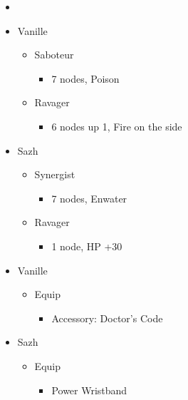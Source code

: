 \documentclass{report}
\begin{document}
\begin{menu}
\begin{itemize}
    \paradigm
    \begin{itemize}
        \item {}%
{\paradigmline{\rav}{\com}{}}%
{\paradigmline{(\sab)}{\com}{}}%
{\paradigmline{\textit{\sab}}{\textit{\syn}}{}}%
{\paradigmline{\rav}{\rav}{}}%
{\paradigmline{[\sab]}{(\rav)}{}}%
{\paradigmline{[\sab]}{\com}{}}
    \end{itemize}
    \crystarium
    \begin{itemize}
        \item Vanille
        \begin{itemize}
            \item Saboteur
            \begin{itemize}
                \item 7 nodes, Poison
            \end{itemize}
            \item Ravager
            \begin{itemize}
                \item 6 nodes up 1, Fire on the side
            \end{itemize}
        \end{itemize}
        \item Sazh
        \begin{itemize}
            \item Synergist
            \begin{itemize}
                \item 7 nodes, Enwater
            \end{itemize}
            \item Ravager
            \begin{itemize}
                \item 1 node, HP +30
            \end{itemize}
        \end{itemize}
    \end{itemize}
    \equip
    \begin{itemize}
        \item Vanille
        \begin{itemize}
            \item Equip
            \begin{itemize}
                \item Accessory: Doctor's Code
            \end{itemize}
        \end{itemize}
        \item Sazh
        \begin{itemize}
            \item Equip
            \begin{itemize}
                \item Power Wristband
            \end{itemize}
        \end{itemize}
    \end{itemize}
\end{itemize}
\end{menu}
\end{document}
